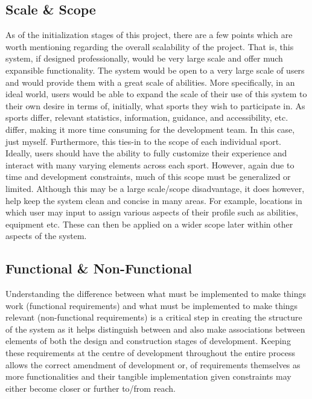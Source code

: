 \documentclass[11pt, english]{article}
\begin{document}
	\subsection{Scale \& Scope}

	As of the initialization stages of this project, there are a few points which are worth mentioning regarding the overall scalability of the project. That is, this system, if designed professionally, would be very large scale and offer much expansible functionality. The system would be open to a very large scale of users and would provide them with a great scale of abilities. More specifically, in an ideal world, users would be able to expand the scale of their use of this system to their own desire in terms of, initially, what sports they wish to participate in. As sports differ, relevant statistics, information, guidance, and accessibility, etc. differ, making it more time consuming for the development team. In this case, just myself. Furthermore, this ties-in to the scope of each individual sport. Ideally, users should have the ability to fully customize their experience and interact with many varying elements across each sport. However, again due to time and development constraints, much of this scope must be generalized or limited. Although this may be a large scale/scope disadvantage, it  does however, help keep the system clean and concise in many areas. For example, locations in which user may input to assign various aspects of their profile such as abilities, equipment etc. These can then be applied on a wider scope later within other aspects of the system. 

	\subsection{Functional \& Non-Functional}

	Understanding the difference between what must be implemented to make things work (functional requirements) and what must be implemented to make things relevant (non-functional requirements) is a critical step in creating the structure of the system as it helps distinguish between and also make associations between elements of both the design and construction stages of development. Keeping these requirements at the centre of development throughout the entire process allows the correct amendment of development or, of requirements themselves as more functionalities and their tangible implementation given constraints may either become closer or further to/from reach.\\
\end{document}
